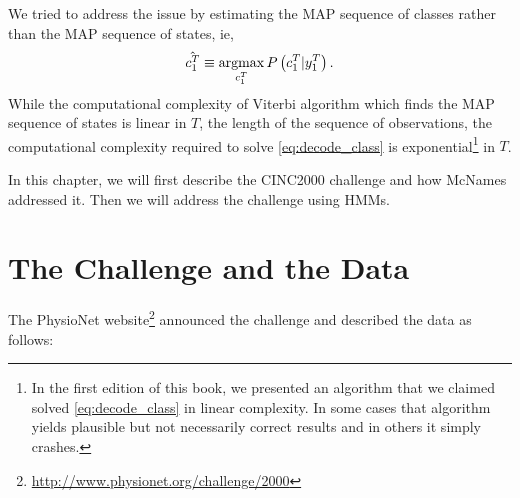 We tried to address the issue by estimating the MAP sequence of classes
rather than the MAP sequence of states, ie,
\begin{equation}
  \label{eq:decode_class}
  \hat {c_{1}^{T}} \equiv
  \operatorname*{argmax}_{c_{1}^{T}}P\left(c_{1}^{T} | y_{1}^{T}\right).
\end{equation}
While the computational complexity of Viterbi algorithm which finds
the MAP sequence of states is linear in $T$, the length of the
sequence of observations, the computational complexity required to
solve \eqref{eq:decode_class} is exponential\footnote{In the first
  edition of this book, we presented an algorithm that we claimed solved
  \eqref{eq:decode_class} in linear complexity.  In some cases that
  algorithm yields plausible but not necessarily correct results and
  in others it simply crashes.} in $T$.

In this chapter, we will first describe the CINC2000 challenge and how
McNames addressed it.  Then we will address the challenge using HMMs.

\section{The  Challenge and the Data}
\label{sec:challenge}

The PhysioNet
website\footnote{\url{http://www.physionet.org/challenge/2000}}
announced the challenge and described the data as follows:

